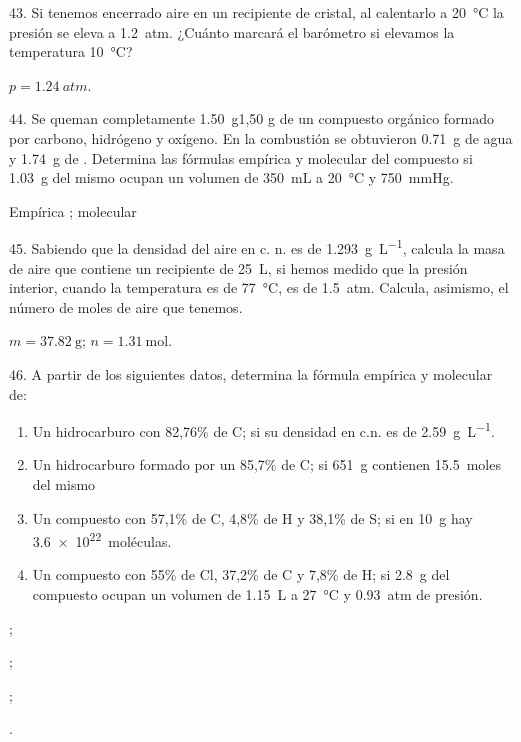 \documentclass[10pt]{article}
\begin{document}
\begin{multicols}{2}
\begin{exercise}
  43. Si tenemos encerrado aire en un recipiente de cristal, al
  calentarlo a \SI{20}{\celsius} la presión se eleva a \SI{1.2}{atm}. ¿Cuánto marcará el barómetro si elevamos la temperatura \SI{10}{\celsius}?
\end{exercise}
\begin{solution}
  $p = \SI{1.24}{atm}$.
\end{solution}

\begin{exercise}
  44. Se queman completamente \SI{1.50}{\gram}1,50 g de un compuesto orgánico
  formado por carbono, hidrógeno y oxígeno. En la combustión
  se obtuvieron \SI{0.71}{\gram} de agua y \SI{1.74}{\gram} de . Determina las fórmulas empírica y molecular del compuesto si
  \SI{1.03}{\gram} del mismo ocupan un volumen de \SI{350}{\milli\liter} a \SI{20}{\celsius} y \SI{750}{\mmHg}.
\end{exercise}
\begin{solution}
  Empírica ; molecular 
\end{solution}

\begin{exercise}
  45. Sabiendo que la densidad del aire en c. n. es de \SI{1.293}{\gram\per\liter}, calcula la masa de aire que contiene un recipiente de \SI{25}{\liter}, si
  hemos medido que la presión interior, cuando la temperatura
  es de \SI{77}{\celsius}, es de \SI{1.5}{atm}. Calcula, asimismo, el número de
  moles de aire que tenemos.
\end{exercise}
\begin{solution}
  $m = \SI{37.82}{\gram}$; $n = \SI{1.31}{\mole}$.
\end{solution}

\begin{exercise}
46. A partir de los siguientes datos, determina la fórmula empírica y molecular de:
\begin{enumerate}
  \item Un hidrocarburo con 82,76\% de C; si su densidad en c.n. es de \SI{2.59}{\gram\per\liter}.
  \item Un hidrocarburo formado por un 85,7\% de C; si \SI{651}{\gram} contienen \SI{15.5}{moles} del mismo
  \item Un compuesto con 57,1\% de C, 4,8\% de H y 38,1\% de S; si en \SI{10}{\gram} hay \SI{3.6e22}{moléculas}.
  \item Un compuesto con 55\% de Cl, 37,2\% de C y 7,8\% de H; si \SI{2.8}{\gram} del compuesto ocupan un volumen de \SI{1.15}{\liter} a \SI{27}{\celsius} y \SI{0.93}{atm} de presión.
\end{enumerate}
\end{exercise}
\begin{solution}
  \begin{enumerate*}
    \item {};
    \item {};
    \item {};
    \item {}.
  \end{enumerate*}
\end{solution}


\end{multicols}
\end{document}
